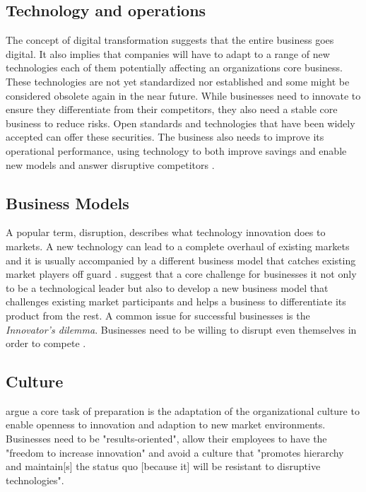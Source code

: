 \subsection{Technology and operations}
The concept of digital transformation suggests that the entire business goes digital. It also implies that companies will have to adapt to a range of new technologies %
 each of them potentially affecting an organizations core business. These technologies are not yet standardized nor established and some might be considered obsolete again in the near future. While businesses need to innovate to ensure they differentiate from their competitors, %
 they also need a stable core business to reduce risks. Open standards and technologies that have been widely accepted can offer these securities.
The business also needs to improve its operational performance, using technology to both improve savings and enable new models and answer disruptive competitors \cite[p.15ff.]{worldforumdigitalenterprise:2016}.


\subsection{Business Models}
A popular term, disruption, describes what technology innovation does to markets. A new technology can lead to a complete overhaul of existing markets and it is usually accompanied by a different business model that catches existing market players off guard \cite{LucasJr200946}. \citeauthor{gassmann2013geschaeftsmodelle} suggest that a core challenge for businesses it not only to be a technological leader but also to develop a new business model that challenges existing market participants and helps a business to differentiate its product from the rest. A common issue for successful businesses is the \emph{Innovator's dilemma}. Businesses need to be willing to disrupt even themselves in order to compete \cite{christensen1997innovator, worldforumdigitalenterprise:2016}.

\subsection{Culture}
\citeauthor{hammer:2015, LucasJr200946} argue a core task of preparation is the adaptation of the organizational culture to enable openness to innovation and adaption to new market environments. Businesses need to be "results-oriented", allow their employees to have the "freedom to increase innovation"\cite{hammer:2015} and avoid a culture that "promotes hierarchy and maintain[s] the status quo [because it] will be resistant to disruptive technologies"\cite{LucasJr200946}.
